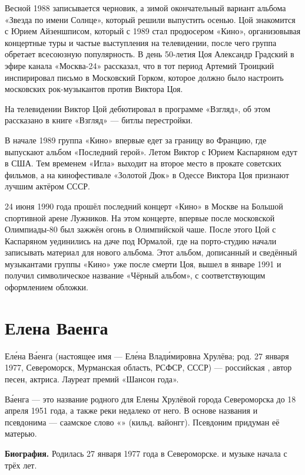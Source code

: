 Весной 1988 записывается черновик, а зимой окончательный вариант альбома «Звезда по имени Солнце», который решили выпустить осенью. Цой знакомится с Юрием Айзеншписом, который с 1989 стал продюсером «Кино», организовывая концертные туры и частые выступления на телевидении, после чего группа обретает всесоюзную популярность. В день 50-летия Цоя Александр Градский в эфире канала «Москва-24» рассказал, что в тот период Артемий Троицкий инспирировал письмо в Московский Горком, которое должно было настроить московских рок-музыкантов против Виктора Цоя.

На телевидении Виктор Цой дебютировал в программе «Взгляд», об этом рассказано в книге «Взгляд» --- битлы перестройки.

В начале 1989 группа «Кино» впервые едет за границу во Францию, где выпускают альбом «Последний герой». Летом Виктор с Юрием Каспаряном едут в США. Тем временем «Игла» выходит на второе место в прокате советских фильмов, а на кинофестивале «Золотой Дюк» в Одессе Виктора Цоя признают лучшим актёром СССР.

24 июня 1990 года прошёл последний концерт «Кино» в Москве на Большой спортивной арене Лужников. На этом концерте, впервые после московской Олимпиады-80 был зажжён огонь в Олимпийской чаше. После этого Цой с Каспаряном уединились на даче под Юрмалой, где на порто-студию начали записывать материал для нового альбома. Этот альбом, дописанный и сведённый музыкантами группы «Кино» уже после смерти Цоя, вышел в январе 1991 и получил символическое название «Чёрный альбом», с соответствующим оформлением обложки.

\section{Елена Ваенга}
Ел\'{е}на В\'{а}енга (настоящее имя --- Ел\'{е}на Влад\'{и}мировна Хрулёва; род. 27 января 1977, Североморск, Мурманская область, РСФСР, СССР) --- российская , автор песен, актриса. Лауреат премий «Шансон года».

В\'{а}енга --- это название родного для Елены Хрулёвой города Североморска до 18 апреля 1951 года, а также реки недалеко от него. В основе названия и псевдонима --- саамское слово «» (кильд. вайонгг). Псевдоним придуман её матерью.

\textbf{Биография.} Родилась 27 января 1977 года в Североморске.  и  музыке начала с трёх лет.


